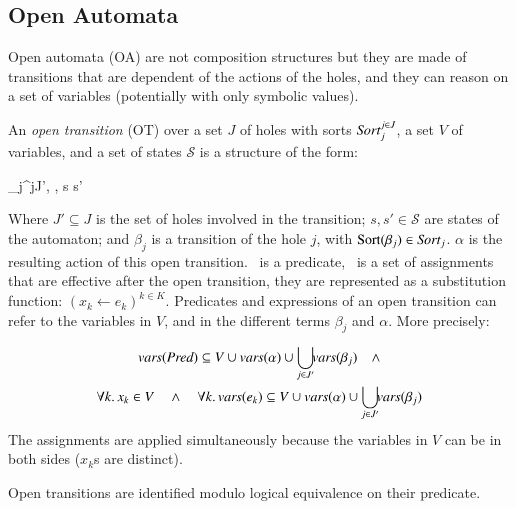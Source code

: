 \documentclass{elsarticle}
\newcommand{\TODO}[1]{\textcolor{red}{\textbf{[TODO:#1]}}}
\begin{document}
\subsection{Open Automata}
 Open automata (OA) are not composition structures but they are made of transitions that are dependent of the actions of the holes, and they can reason on a set of variables (potentially with only symbolic values). 
\begin{definition}\label{def:OT}
	\label{def:OpenTransitions}
	An \emph{open transition} (OT) over a
	set $J$ of holes with sorts $\Sort_j^{j\in J}$, a set $V$ of variables, and a set of states $\mathcal{S}$ is 
	a structure of the form:	
	\begin{mathpar}
	\openrule
	{	\beta_j^{j\in J'}, \Pred, \Post}
	{s \OTarrow {\alpha}s'}
	\end{mathpar}
	Where $J'\subseteq J$ is the set of holes involved in the transition; $s, s'\in\mathcal{S}$ are states of the automaton; and $\beta_j$
        is a transition of the hole $j$, with $\Sortop(\beta_j)\in\Sort_j$. $\alpha$  is the resulting action of this open transition.
        \Pred\ is a predicate, \Post\ is a set of 
	assignments that are effective after the open transition, they are
        represented as a substitution function: $({x_k\gets e_k})^{k\in K}$.
Predicates and expressions of an open transition can refer to the variables in $V$, and
        in the different terms
        $\beta_j$ and $\alpha$. More precisely:

\begin{multline*}
 \vars(\Pred) \subseteq V\cup\vars(\alpha)\cup
			{\displaystyle \bigcup_{j\in J'}\!\!\vars(\beta_j)}\quad\land\\
\forall k.\, x_k\in V \quad\land\quad \forall k.\,\vars(e_k)\subseteq V\cup\vars(\alpha)\cup
			{\displaystyle \bigcup_{j\in J'}\!\!\vars(\beta_j)}
\end{multline*}
The assignments are applied simultaneously because the variables in $V$ can be in both sides ($x_k$s are distinct).

 Open transitions are identified
        modulo logical equivalence on their predicate. 
\end{definition}
\end{document}
